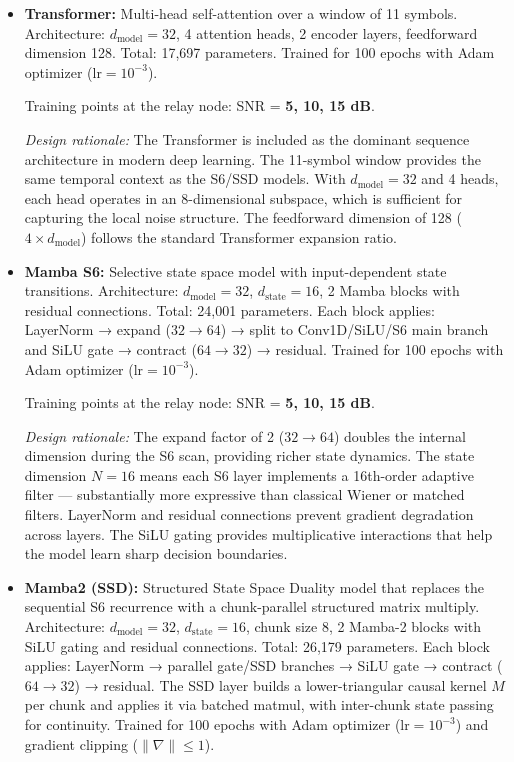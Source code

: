 \begin{itemize}
\item
  \textbf{Transformer:} Multi-head self-attention over a window of 11 symbols. Architecture: \(d_{\text{model}}=32\), 4 attention heads, 2 encoder layers, feedforward dimension 128. Total: 17,697 parameters. Trained for 100 epochs with Adam optimizer (\(\text{lr}=10^{-3}\)).

  Training points at the relay node: SNR = \textbf{5, 10, 15 dB}.

  \emph{Design rationale:} The Transformer is included as the dominant sequence architecture in modern deep learning. The 11-symbol window provides the same temporal context as the S6/SSD models. With \(d_{\text{model}} = 32\) and 4 heads, each head operates in an 8-dimensional subspace, which is sufficient for capturing the local noise structure. The feedforward dimension of 128 (\(4 \times d_{\text{model}}\)) follows the standard Transformer expansion ratio.
\item
  \textbf{Mamba S6:} Selective state space model with input-dependent state transitions. Architecture: \(d_{\text{model}}=32\), \(d_{\text{state}}=16\), 2 Mamba blocks with residual connections. Total: 24,001 parameters. Each block applies: LayerNorm → expand (\(32 \to 64\)) → split to Conv1D/SiLU/S6 main branch and SiLU gate → contract (\(64 \to 32\)) → residual. Trained for 100 epochs with Adam optimizer (\(\text{lr}=10^{-3}\)).

  Training points at the relay node: SNR = \textbf{5, 10, 15 dB}.

  \emph{Design rationale:} The expand factor of 2 (\(32 \to 64\)) doubles the internal dimension during the S6 scan, providing richer state dynamics. The state dimension \(N = 16\) means each S6 layer implements a 16th-order adaptive filter --- substantially more expressive than classical Wiener or matched filters. LayerNorm and residual connections prevent gradient degradation across layers. The SiLU gating provides multiplicative interactions that help the model learn sharp decision boundaries.
\item
  \textbf{Mamba2 (SSD):} Structured State Space Duality model that replaces the sequential S6 recurrence with a chunk-parallel structured matrix multiply. Architecture: \(d_{\text{model}}=32\), \(d_{\text{state}}=16\), chunk size 8, 2 Mamba-2 blocks with SiLU gating and residual connections. Total: 26,179 parameters. Each block applies: LayerNorm → parallel gate/SSD branches → SiLU gate → contract (\(64 \to 32\)) → residual. The SSD layer builds a lower-triangular causal kernel \(M\) per chunk and applies it via batched matmul, with inter-chunk state passing for continuity. Trained for 100 epochs with Adam optimizer (\(\text{lr}=10^{-3}\)) and gradient clipping (\(\|\nabla\| \le 1\)).


\end{itemize}
